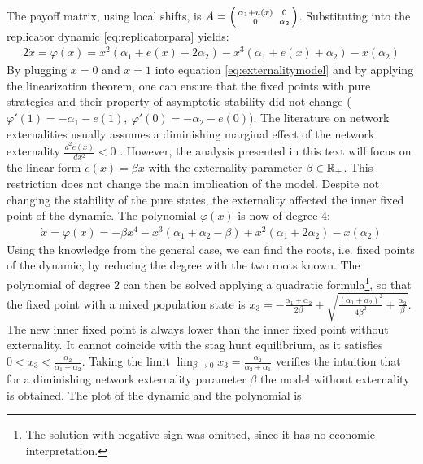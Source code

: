 The payoff matrix, using local shifts, is 
$A=\begin{psmallmatrix}\alpha_1+u(x) && 0 \\ 0&& \alpha_2\end{psmallmatrix}$. 
Substituting into the replicator dynamic  \eqref{eq:replicatorpara} yields:
\begin{alignat}{2}
        \dot{x} = \varphi(x) = x^2(\alpha_1+e(x) +2\alpha_2 ) 
        - x^3(\alpha_1+e(x)+\alpha_2) - x(\alpha_2)
        \label{eq:externalitymodel}
\end{alignat}
By plugging $x=0$ and $x=1$ into equation \eqref{eq:externalitymodel} and 
by applying the linearization theorem, one can ensure 
that the fixed points with pure strategies and their
property of asymptotic stability did not change
($\varphi'(1) = -\alpha_1 -e(1),\ \varphi'(0) = -\alpha_2 -e(0)$).
The literature on network externalities usually assumes a diminishing
marginal effect of the network externality $\frac{d^2e(x)}{dx^2} <0$ 
\parencite[73]{lin_impact_2008}. However, the analysis presented in this text
will focus on the linear form $e(x) = \beta x$ with the externality parameter
$\beta \in \mathbb{R}_+$. This restriction does not change the main implication
of the model. 
Despite not changing the stability of the pure states, 
the externality affected the inner fixed point of the dynamic.
The polynomial $\varphi(x)$ is now of degree $4$:
\begin{align}
        \dot{x} = \varphi(x) = -\beta x^4 -x^3(\alpha_1 + \alpha_2 
        - \beta ) + x^2 (\alpha_1 + 2 \alpha_2) - x(\alpha_2)
\end{align}
Using the knowledge from the general case, we can find the roots, i.e. fixed
points of the dynamic, by reducing the degree with the two roots known. The
polynomial of degree $2$ can then be solved applying a quadratic formula\footnote{
The solution with negative sign was omitted, since it has no economic 
interpretation.}, so that the fixed point with a mixed population state is
$x_3 = -\frac{\alpha_1+\alpha_2}{2 \beta} + 
\sqrt{\frac{(\alpha_1+\alpha_2)^2}{4\beta^2} +\frac{\alpha_2}{\beta}}$. 
The new inner fixed point is always lower than the inner fixed point without 
externality. It cannot coincide with the stag hunt equilibrium, as it 
satisfies $0<x_3<\frac{\alpha_2}{\alpha_1+\alpha_2}$. 
Taking the limit $\lim_{\beta \rightarrow 0} x_3 = 
\frac{\alpha_2}{\alpha_2+\alpha_1}$ verifies the intuition that for a 
diminishing network externality parameter $\beta$ the model without 
externality is obtained.
The plot of the dynamic and the polynomial is 
